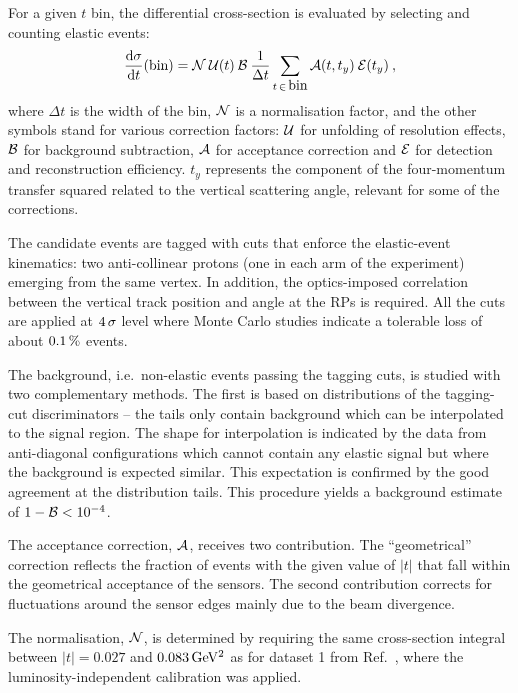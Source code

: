 \documentclass[doublecol]{epl/epl2}
\def\d{{\rm d}}
\def\un#1{\,{\rm #1}}
\def\text#1{\hbox{#1}}
\begin{document}
For a given $t$ bin, the differential cross-section is evaluated by selecting and counting elastic events:
\begin{equation}
	{\d\sigma\over \d t}(\hbox{bin}) =
		{\cal N}\: {\cal U}(t)\: {\cal B} \: 
		\frac{1}{\Delta t}
                \sum\limits_{t\, \in\, \text{bin}} {\cal A}(t, t_y)\: {\cal E}(t_y) \: ,
\end{equation}
where $\Delta t$ is the width of the bin, ${\cal N}$ is a normalisation factor, 
and the other symbols stand for various correction factors:
${\cal U}$ for unfolding of resolution effects, ${\cal B}$ for background subtraction, ${\cal A}$ for acceptance correction and ${\cal E}$ for detection and reconstruction efficiency. $t_y$ represents the component of the four-momentum transfer squared related to the vertical scattering angle, relevant for some of the corrections.

The candidate events are tagged with cuts that enforce the elastic-event kinematics: two anti-collinear protons (one in each arm of the experiment) emerging from the same vertex. In addition, the optics-imposed correlation between the vertical track position and angle at the RPs is required. All the cuts are applied at $4\un{\sigma}$ level where Monte Carlo studies indicate a tolerable loss of about $0.1\un{\%}$ events.

The background, i.e.~non-elastic events passing the tagging cuts, is studied with two complementary methods. The first is based on distributions of the tagging-cut discriminators -- the tails only contain background which can be interpolated to the signal region. The shape for interpolation is indicated by the data from anti-diagonal configurations which cannot contain any elastic signal but where the background is expected similar. This expectation is confirmed by the good agreement at the distribution tails. This procedure yields a background estimate of $1 - {\cal B} < 10^{-4}$.

The acceptance correction, ${\cal A}$, receives two contribution. The ``geometrical'' correction reflects the fraction of events with the given value of $|t|$ that fall within the geometrical acceptance of the sensors. The second contribution corrects for fluctuations around the sensor edges mainly due to the beam divergence.

The normalisation, ${\cal N}$, is determined by requiring the same cross-section integral between $|t| = 0.027$ and $0.083\un{GeV^2}$ as for dataset 1 from Ref.~\cite{totem-8tev-tot1}, where the luminosity-independent calibration was applied.
\end{document}
